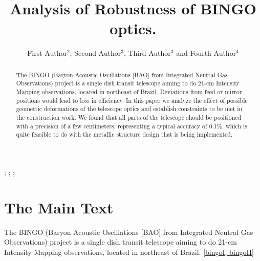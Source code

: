 \documentclass{ws-jai}
\begin{document}
\catchline{}{}{}{}{} %


\title{Analysis of Robustness of BINGO optics.}

\author{First Author$^{2}$, Second Author$^{3}$, Third Author$^{3}$ and Fourth Author$^{4}$}

\address{
$^{2}$Department, University Name, City, State ZIP/Zone, Country, fauthor@university.com\\
$^{3}$Group, Company, Address, City, State ZIP/Zone, Country\\
$^{4}$Group, Company, Address, City, State ZIP/Zone, Country, fauthor@company.com
}

\maketitle


\begin{history}
;
;
;
\end{history}

\begin{abstract}
The BINGO (Baryon Acoustic Oscillations [BAO] from Integrated Neutral Gas Observations) project is a single dish transit telescope aiming to do 21-cm Intensity Mapping observations, located in northeast of Brazil. Deviations from feed or mirror positions would lead to loss in efficiency. In this paper we analyze the effect of possible geometric deformations of the telescope optics and establish constraints to be met in the construction work. We found that all parts of the telescope should be positioned with a precision of a few centimeters, representing a typical accuracy of 0.1\%, which is quite feasible to do with the metallic structure design that is being implemented.
\end{abstract}


\section{The Main Text}
\noindent The BINGO (Baryon Acoustic Oscillations [BAO] from Integrated Neutral Gas Observations) project is a single dish transit telescope aiming to do 21-cm Intensity Mapping observations, located in northeast of Brazil. \ref{bingoI, bingoII}
\end{document}
